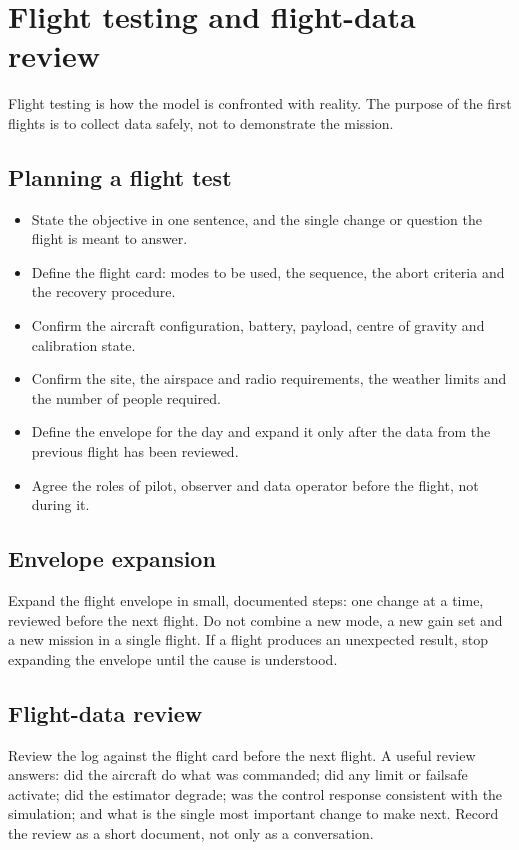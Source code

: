 \documentclass[11pt,a4paper]{article}
\begin{document}
\section{Flight testing and flight-data review}

Flight testing is how the model is confronted with reality. The purpose of the
first flights is to collect data safely, not to demonstrate the mission.

\subsection{Planning a flight test}

\begin{itemize}
  \item State the objective in one sentence, and the single change or question the flight is meant to answer.
  \item Define the flight card: modes to be used, the sequence, the abort criteria and the recovery procedure.
  \item Confirm the aircraft configuration, battery, payload, centre of gravity and calibration state.
  \item Confirm the site, the airspace and radio requirements, the weather limits and the number of people required.
  \item Define the envelope for the day and expand it only after the data from the previous flight has been reviewed.
  \item Agree the roles of pilot, observer and data operator before the flight, not during it.
\end{itemize}

\subsection{Envelope expansion}

Expand the flight envelope in small, documented steps: one change at a time,
reviewed before the next flight. Do not combine a new mode, a new gain set and
a new mission in a single flight. If a flight produces an unexpected result,
stop expanding the envelope until the cause is understood.

\subsection{Flight-data review}

Review the log against the flight card before the next flight. A useful review
answers: did the aircraft do what was commanded; did any limit or failsafe
activate; did the estimator degrade; was the control response consistent with
the simulation; and what is the single most important change to make next. Record
the review as a short document, not only as a conversation.
\end{document}
